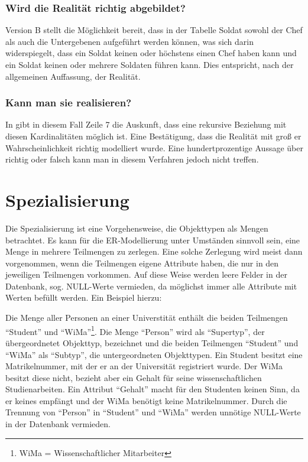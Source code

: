           \subsubsection{Wird die Realität richtig abgebildet?}
            Version B stellt die Möglichkeit bereit, dass in der Tabelle Soldat sowohl der Chef als auch die Untergebenen aufgeführt werden können, was sich darin widerspiegelt, dass ein Soldat keinen oder höchstens einen Chef haben kann und ein Soldat keinen oder mehrere Soldaten führen kann. Dies entspricht, nach der allgemeinen Auffassung, der Realität.
          \subsubsection{Kann man sie realisieren?}
            In  gibt in diesem Fall Zeile 7 die Auskunft, dass eine rekursive Beziehung mit diesen Kardinalitäten möglich ist. Eine Bestätigung, dass die Realität mit groß er Wahrscheinlichkeit richtig modelliert wurde. Eine hundertprozentige Aussage über richtig oder falsch kann man in diesem Verfahren jedoch nicht treffen.
    \section{Spezialisierung}
      \label{specialization}
       Die Spezialisierung ist eine Vorgehensweise, die Objekttypen als Mengen
       betrachtet. Es kann für die ER-Modellierung unter Umständen sinnvoll
       sein, eine Menge in mehrere Teilmengen zu zerlegen. Eine solche Zerlegung
       wird meist dann vorgenommen, wenn die Teilmengen eigene Attribute haben,
       die nur in den jeweiligen Teilmengen vorkommen. Auf diese Weise werden
       leere Felder in der Datenbank, sog. NULL-Werte vermieden, da möglichst
       immer alle Attribute mit Werten befüllt werden. Ein Beispiel hierzu:

       Die Menge aller Personen an einer Universtität enthält die beiden
       Teilmengen \enquote{Student} und \enquote{WiMa}\footnote{WiMa =
       Wissenschaftlicher Mitarbeiter}. Die Menge \enquote{Person} wird als
       \enquote{Supertyp}, der übergeordnetet Objekttyp, bezeichnet und die
       beiden Teilmengen \enquote{Student} und \enquote{WiMa} als
       \enquote{Subtyp}, die untergeordneten Objekttypen.
\clearpage
       Ein Student besitzt eine Matrikelnummer, mit der er an der Universität
       registriert wurde. Der WiMa besitzt diese nicht, bezieht aber ein Gehalt
       für seine wissenschaftlichen Studienarbeiten. Ein Attribut
       \enquote{Gehalt} macht für den Studenten keinen Sinn, da er keines
       empfängt und der WiMa benötigt keine Matrikelnummer. Durch die
       Trennung von \enquote{Person} in \enquote{Student} und \enquote{WiMa}
       werden unnötige NULL-Werte in der Datenbank vermieden.

